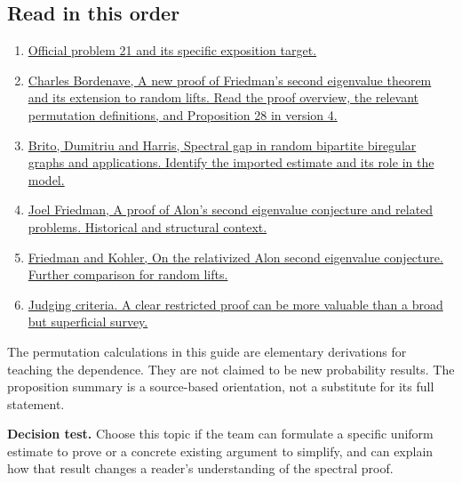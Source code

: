 \documentclass[11pt,letterpaper]{article}
\newcommand{\Sub}[1]{\subsection*{#1}}
\newcommand{\source}[2]{\item \href{#1}{#2}}
\begin{document}
\Sub{Read in this order}
\begin{enumerate}
\source{https://competition.sair.foundation/competitions/mathathon/problems/21}{Official problem 21 and its specific exposition target.}
\source{https://arxiv.org/abs/1502.04482}{Charles Bordenave, A new proof of Friedman's second eigenvalue theorem and its extension to random lifts. Read the proof overview, the relevant permutation definitions, and Proposition 28 in version 4.}
\source{https://arxiv.org/abs/1804.07808}{Brito, Dumitriu and Harris, Spectral gap in random bipartite biregular graphs and applications. Identify the imported estimate and its role in the model.}
\source{https://arxiv.org/abs/cs/0405020}{Joel Friedman, A proof of Alon's second eigenvalue conjecture and related problems. Historical and structural context.}
\source{https://arxiv.org/abs/1403.3462}{Friedman and Kohler, On the relativized Alon second eigenvalue conjecture. Further comparison for random lifts.}
\source{https://competition.sair.foundation/competitions/mathathon/judge-rules}{Judging criteria. A clear restricted proof can be more valuable than a broad but superficial survey.}
\end{enumerate}
The permutation calculations in this guide are elementary derivations for teaching the dependence. They are not claimed to be new probability results. The proposition summary is a source-based orientation, not a substitute for its full statement.

\textbf{Decision test.} Choose this topic if the team can formulate a specific uniform estimate to prove or a concrete existing argument to simplify, and can explain how that result changes a reader's understanding of the spectral proof.
\end{document}
